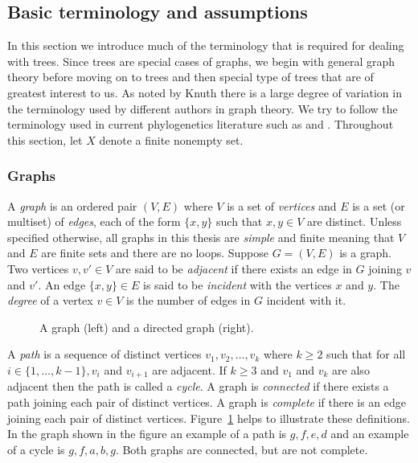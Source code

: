\subsection{Basic terminology and assumptions}
\label{sec:basic-term-assumpt}

In this section we introduce much of the terminology that is required for
dealing with trees.  Since trees are special cases of graphs, we begin with
general graph theory before moving on to trees and then special type of trees
that are of greatest interest to us.  As noted by Knuth \cite{knuth97taocp1}
there is a large degree of variation in the terminology used by different
authors in graph theory.  We try to follow the terminology used in current
phylogenetics literature such as \cite{semple2003phylogenetics} and
\cite{DHS11}.  Throughout this section, let $X$ denote a finite nonempty set.

\subsubsection{Graphs}
\label{sec:graphs}

A \textit{graph} is an ordered pair $(V,E)$ where $V$ is a set of
\textit{vertices} and $E$ is a set (or multiset) of \textit{edges}, each of
the form $\{x,y\}$ such that $x,y \in V$ are distinct.  Unless specified
otherwise, all graphs in this thesis are \textit{simple} and finite meaning
that $V$ and $E$ are finite sets and there are no loops.  Suppose $G = (V,E)$
is a graph. Two vertices $v,v' \in V$ are said to be \textit{adjacent} if
there exists an edge in $G$ joining $v$ and $v'$.  An edge $\{x,y\} \in E$ is
said to be \textit{incident} with the vertices $x$ and $y$.  The
\textit{degree} of a vertex $v \in V$ is the number of edges in $G$ incident
with it.

\begin{figure}
  \centering
  
  \caption{A graph (left) and a directed graph (right).}
  \label{fig:graph-ex}
\end{figure}

A \textit{path} is a sequence of distinct vertices $v_1,v_2,\dotsc,v_k$ where
$k \geq 2$ such that for all $i \in \{1,\dotsc,k-1\}, v_i$ and $v_{i+1}$ are
adjacent.  If $k \geq 3$ and $v_1$ and $v_k$ are also adjacent then the path
is called a \textit{cycle}.  A graph is \textit{connected} if there exists a
path joining each pair of distinct vertices.  A graph is \textit{complete} if
there is an edge joining each pair of distinct vertices.
Figure~\ref{fig:graph-ex} helps to illustrate these definitions.  In the graph
shown in the figure an example of a path is $g,f,e,d$ and an example of a
cycle is $g,f,a,b,g$.  Both graphs are connected, but are not complete.


